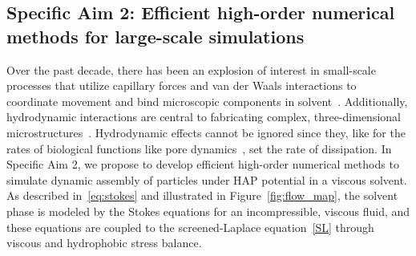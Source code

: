 \subsection{Specific Aim 2: Efficient high-order numerical methods for
large-scale simulations}
Over the past decade, there has been an explosion of interest in
small-scale processes that utilize capillary forces and van der Waals
interactions to coordinate movement
and bind microscopic components in solvent~\cite{Pandey2011, Zhang2017, Siontorou2017}.
Additionally, hydrodynamic interactions are central to fabricating complex,
three-dimensional microstructures~\cite{Dasgupta2017, Leong2007, Reynolds2019, Cho2010}.
Hydrodynamic effects cannot
be ignored since they, like for the rates of biological functions 
like pore dynamics~\cite{RYHAM20112929}, set the rate of dissipation.
%
In Specific Aim 2, we propose to develop efficient high-order numerical
methods to simulate dynamic assembly of particles under HAP potential in
a viscous solvent. 
%
%
%
%
%
As described in~\eqref{eq:stokes} and illustrated in
Figure~\ref{fig:flow_map}, the solvent phase is modeled by the Stokes
equations for an incompressible, viscous fluid, and these equations are
coupled to the screened-Laplace equation~\eqref{SL} through viscous and
hydrophobic stress balance. 
 


